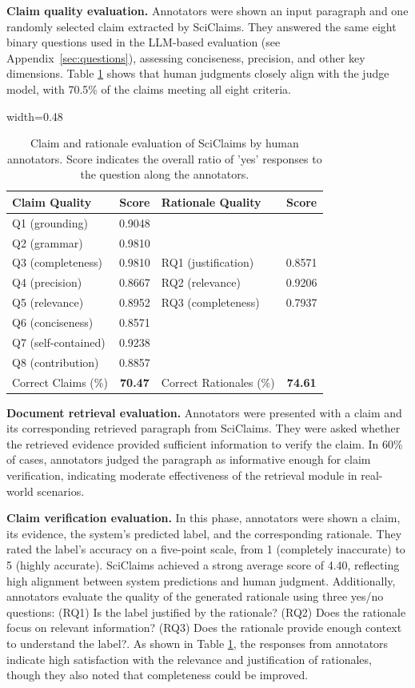 \documentclass[11pt]{article}
\begin{document}
\textbf{Claim quality evaluation.} Annotators were shown an input paragraph and one randomly selected claim extracted by SciClaims. They answered the same eight binary questions used in the LLM-based evaluation (see Appendix~\ref{sec:questions}), assessing conciseness, precision, and other key dimensions. Table \ref{table:results_human} shows that human judgments closely align with the judge model, with 70.5\% of the claims meeting all eight criteria.

 \begin{table}[ht]
\footnotesize
\centering
\begin{adjustbox}{width=0.48\textwidth}
\begin{tabular}{lc | lc}
\toprule
Claim Quality & Score & Rationale Quality & Score \\ \midrule
Q1 (grounding) & 0.9048 \\
Q2 (grammar) & 0.9810 \\
Q3 (completeness) & 0.9810 & RQ1 (justification) & 0.8571\\
Q4 (precision) & 0.8667 & RQ2 (relevance) & 0.9206 \\
Q5 (relevance) & 0.8952 & RQ3 (completeness) & 0.7937\\
Q6 (conciseness) & 0.8571 \\
Q7 (self-contained) & 0.9238\\
Q8 (contribution) & 0.8857 \\\midrule
Correct Claims (\%) & \textbf{70.47} & Correct Rationales (\%) & \textbf{74.61}\\
\bottomrule
\end{tabular}
\end{adjustbox}
\caption{Claim and rationale evaluation of SciClaims by human annotators. Score indicates the overall ratio of 'yes' responses to the question along the annotators.}
\label{table:results_human}
\end{table}

\textbf{Document retrieval evaluation.} Annotators were presented with a claim and its corresponding retrieved paragraph from SciClaims. They were asked whether the retrieved evidence provided sufficient information to verify the claim. In 60\% of cases, annotators judged the paragraph as informative enough for claim verification, indicating moderate effectiveness of the retrieval module in real-world scenarios.

\textbf{Claim verification evaluation.} In this phase, annotators were shown a claim, its evidence, the system’s predicted label, and the corresponding rationale. They rated the label’s accuracy on a five-point scale, from 1 (completely inaccurate) to 5 (highly accurate). SciClaims achieved a strong average score of 4.40, reflecting high alignment between system predictions and human judgment. Additionally, annotators evaluate the quality of the generated rationale using three yes/no questions: (RQ1) Is the label justified by the rationale? (RQ2) Does the rationale focus on relevant information? (RQ3) Does the rationale provide enough context to understand the label?. As shown in Table \ref{table:results_human}, the responses from annotators indicate high satisfaction with the relevance and justification of rationales, though they also noted that completeness could be improved.
\end{document}
